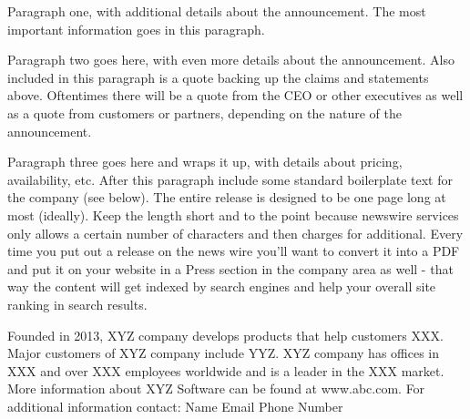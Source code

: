 \documentclass[11pt,pressrelease]{newlfm} %
\begin{document}
\begin{newlfm}



Paragraph one, with additional details about the announcement. The most important information goes in this paragraph.

Paragraph two goes here, with even more details about the announcement. Also included in this paragraph is a quote backing up the claims and statements above. Oftentimes there will be a quote from the CEO or other executives as well as a quote from customers or partners, depending on the nature of the announcement.

Paragraph three goes here and wraps it up, with details about pricing, availability, etc. After this paragraph include some standard boilerplate text for the company (see below). The entire release is designed to be one page long at most (ideally). Keep the length short and to the point because newswire services only allows a certain number of characters and then charges for additional. Every time you put out a release on the news wire you'll want to convert it into a PDF and put it on your website in a Press section in the company area as well - that way the content will get indexed by search engines and help your overall site ranking in search results.

Founded in 2013, XYZ company develops products that help customers XXX. Major customers of XYZ company include YYZ. XYZ company has offices in XXX and over XXX employees worldwide and is a leader in the XXX market. More information about XYZ Software can be found at www.abc.com.
For additional information contact: Name Email Phone Number



\end{newlfm}
\end{document}
